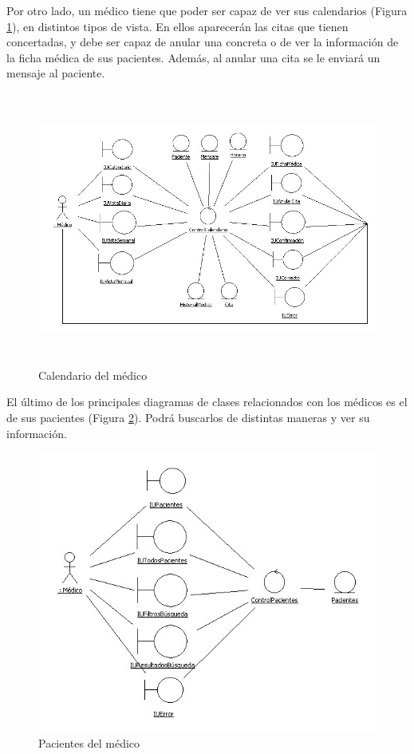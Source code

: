 	Por otro lado, un médico tiene que poder ser capaz de ver sus calendarios (Figura \ref{fig:col_clase5}), en distintos tipos de vista. En ellos aparecerán las citas que tienen concertadas, y debe ser capaz de anular una concreta o de ver la información de la ficha médica de sus pacientes. Además, al anular una cita se le enviará un mensaje al paciente.
	\begin{figure}[H]
	  \centering
	    \includegraphics[width=16cm, height=9cm]{img/jpg/clases/5_CalendarioMedico.jpg}
	  \caption{Calendario del médico}
	  \label{fig:col_clase5}
	\end{figure}
	
	
	El último de los principales diagramas de clases relacionados con los médicos es el de sus pacientes (Figura \ref{fig:col_clase6}). Podrá buscarlos de distintas maneras y ver su información.
	\begin{figure}[H]
	  \centering
	    \includegraphics[width=16cm]{img/jpg/clases/6_MedicosPacientes.jpg}
	  \caption{Pacientes del médico}
	  \label{fig:col_clase6}
	\end{figure}

